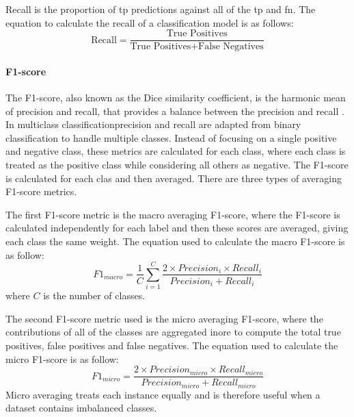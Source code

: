 \documentclass[10pt, conference]{IEEEtran}
\begin{document}
Recall is the proportion of \acrshort{tp} predictions against all of the \acrshort{tp} and \acrfull{fn}.
The equation to calculate the recall of a classification model is as follows:
\begin{equation}
    \text{Recall} = \frac{\text{True Positives}}{\text{True Positives} + \text{False Negatives}} \label{Recall}
\end{equation}

\paragraph{F1-score}

The F1-score, also known as the Dice similarity coefficient, is the harmonic mean of precision and recall,
that provides a balance between the precision and recall \cite{F1-score_ref}.
In multiclass classificationprecision and recall are adapted from binary classification to handle multiple classes.
Instead of focusing on a single positive and negative class, these metrics are calculated for each class,
where each class is treated as the positive class while considering all others as negative. The F1-score
is calculated for each clas and then averaged. There are three types of averaging F1-score metrics.

The first F1-score metric is the macro averaging F1-score, where the F1-score is calculated  independently for each label
and then these scores are averaged, giving each class the same weight. The equation used to calculate the macro F1-score is
as follow:
\begin{equation}
    F1_{macro} = \frac{1}{C} \sum_{i=1}^{C} \frac{2 \times Precision_i \times Recall_i}{Precision_i + Recall_i} \label{macro_F1}
\end{equation}
where $C$ is the number of classes.

The second F1-score metric used is the micro averaging F1-score, where the contributions of all of the classes
are aggregated inore to compute the total true positives, false positives and false negatives. The equation used
to calculate the micro F1-score is as follow:
\begin{equation}
    F1_{micro} = \frac{2 \times Precision_{micro} \times Recall_{micro}}{Precision_{micro} + Recall_{micro}} \label{micro_F1}
\end{equation}
Micro averaging treats each instance equally and is therefore useful when a dataset contains imbalanced classes. 
\end{document}

